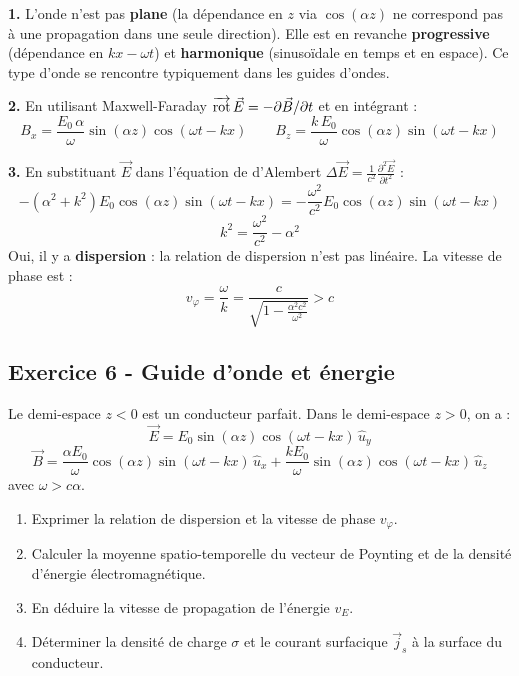 \documentclass[12pt,a4paper]{article}
\begin{document}
\begin{boitecorrige}
\textbf{1.} L'onde n'est pas \textbf{plane} (la dépendance en $z$ via $\cos(\alpha z)$ ne correspond pas à une propagation dans une seule direction). Elle est en revanche \textbf{progressive} (dépendance en $kx - \omega t$) et \textbf{harmonique} (sinusoïdale en temps et en espace). Ce type d'onde se rencontre typiquement dans les guides d'ondes.

\textbf{2.} En utilisant Maxwell-Faraday $\overrightarrow{\mathrm{rot}}\,\vec{E} = -\partial\vec{B}/\partial t$ et en intégrant :
\[
B_x = \frac{E_0\,\alpha}{\omega}\sin(\alpha z)\cos(\omega t - kx) \qquad B_z = \frac{k\,E_0}{\omega}\cos(\alpha z)\sin(\omega t - kx)
\]

\textbf{3.} En substituant $\vec{E}$ dans l'équation de d'Alembert $\Delta\vec{E} = \frac{1}{c^2}\frac{\partial^2\vec{E}}{\partial t^2}$ :
\[
-(\alpha^2 + k^2)E_0\cos(\alpha z)\sin(\omega t - kx) = -\frac{\omega^2}{c^2}E_0\cos(\alpha z)\sin(\omega t - kx)
\]
\[
\boxed{k^2 = \frac{\omega^2}{c^2} - \alpha^2}
\]
Oui, il y a \textbf{dispersion} : la relation de dispersion n'est pas linéaire. La vitesse de phase est :
\[
v_\varphi = \frac{\omega}{k} = \frac{c}{\sqrt{1 - \frac{\alpha^2 c^2}{\omega^2}}} > c
\]
\end{boitecorrige}

\subsection*{Exercice 6 - Guide d'onde et énergie \niveau{\difficile}}

\newpage
\begin{boiteexercice}
Le demi-espace $z < 0$ est un conducteur parfait. Dans le demi-espace $z > 0$, on a :
\[
\vec{E} = E_0\sin(\alpha z)\cos(\omega t - kx)\,\hat{u}_y
\]
\[
\vec{B} = \frac{\alpha E_0}{\omega}\cos(\alpha z)\sin(\omega t - kx)\,\hat{u}_x + \frac{kE_0}{\omega}\sin(\alpha z)\cos(\omega t - kx)\,\hat{u}_z
\]
avec $\omega > c\alpha$.

\begin{enumerate}
  \item Exprimer la relation de dispersion et la vitesse de phase $v_\varphi$.
  \item Calculer la moyenne spatio-temporelle du vecteur de Poynting et de la densité d'énergie électromagnétique.
  \item En déduire la vitesse de propagation de l'énergie $v_E$.
  \item Déterminer la densité de charge $\sigma$ et le courant surfacique $\vec{j}_s$ à la surface du conducteur.
\end{enumerate}
\end{boiteexercice}
\end{document}
